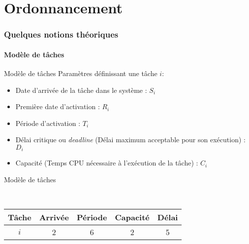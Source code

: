 %
%
%

\part{Ordonnancement}

\begin{frame}
  \partpage
\end{frame}

\begin{frame}
  \tableofcontents[currentpart]
\end{frame}

\section{Quelques notions théoriques}

\subsection{Modèle de tâches}

\begin{frame}{Modèle de tâches}
  Paramètres définissant une tâche $i$:
  \begin{itemize}
    \item Date d'arrivée de la tâche dans le système : $S_i$
    \item Première date d'activation : $R_i$
    \item Période d'activation : $T_i$
    \item Délai critique  ou \emph{deadline} (Délai maximum acceptable
      pour son exécution) : $D_i$
    \item Capacité (Temps CPU nécessaire à l'exécution de la tâche) :
      $C_i$
  \end{itemize}
\end{frame}

\begin{frame}{Modèle de tâches}
  \begin{center}
    \\
    \begin{tabular}{ccccc}
      \hline
      Tâche & Arrivée & Période & Capacité & Délai \\
      \hline
      $i$ & 2 & 6 & 2 & 5\\
      \hline
    \end{tabular}
  \end{center}
\end{frame}

